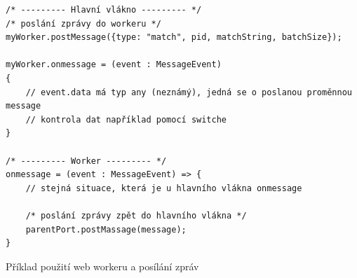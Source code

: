 \begin{code}[!ht]
	\begin{verbatim}
/* --------- Hlavní vlákno --------- */
/* poslání zprávy do workeru */
myWorker.postMessage({type: "match", pid, matchString, batchSize});

myWorker.onmessage = (event : MessageEvent)
{
	// event.data má typ any (neznámý), jedná se o poslanou proměnnou message 
	// kontrola dat například pomocí switche
}

/* --------- Worker --------- */
onmessage = (event : MessageEvent) => {
	// stejná situace, která je u hlavního vlákna onmessage

	/* poslání zprávy zpět do hlavního vlákna */
	parentPort.postMassage(message);
}
	\end{verbatim}
	\caption{Příklad použití web workeru a posílání zpráv}
	\label{code:worker}
\end{code}
\endinput